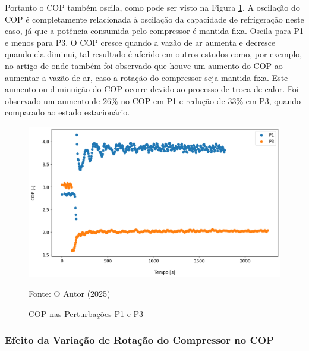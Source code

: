 Portanto o COP também oscila, como pode ser visto na Figura \ref{fig:COP Perturbação Ventilador}. A oscilação do COP é completamente relacionada à oscilação da capacidade de refrigeração neste caso, já que a potência consumida pelo compressor é mantida fixa. Oscila para P1 e menos para P3. O COP cresce quando a vazão de ar aumenta e decresce quando ela diminui, tal resultado é aferido em outros estudos como, por exemplo, no artigo de \textcite{FanSpeedCOP-AlBadri} onde também foi observado que houve um aumento do COP ao aumentar a vazão de ar, caso a rotação do compressor seja mantida fixa. Este aumento ou diminuição do COP ocorre devido ao processo de troca de calor. Foi observado um aumento de 26\% no COP em P1 e redução de 33\% em P3, quando comparado ao estado estacionário.
\newpage
\begin{figure}[h]
    \centering
    \includegraphics[width=1\linewidth]{FigurasdoTexto/COP Perturbação Ventilador.png}
    \caption{COP nas Perturbações P1 e P3}
    \label{fig:COP Perturbação Ventilador}
    {\footnotesize Fonte: O Autor (2025)}
\end{figure}

\subsubsection{Efeito da Variação de Rotação do Compressor no COP}

